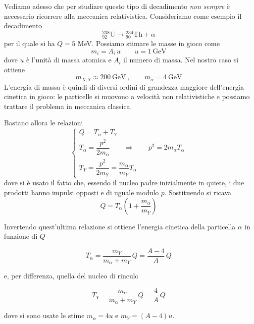 Vediamo adesso che per studiare questo tipo di decadimento \emph{non sempre} è necessario ricorrere alla meccanica relativistica. Consideriamo come esempio il decadimento 
%
\begin{equation*}
    {}^{238}_{92}\mathrm{U} \longrightarrow {}^{234}_{90}\mathrm{Th} + \alpha
\end{equation*}
per il quale si ha $Q = 5$ MeV. Possiamo stimare le masse in gioco come 
%
\begin{equation}
    m_i = A_i \, u \qquad u = 1 \ \mathrm{GeV}
\end{equation}
dove $u$ è l'unità di massa atomica e $A_i$ il numero di massa. Nel nostro caso si ottiene 
%
\begin{equation}
    m_{X,Y} \approx 200 \ \mathrm{GeV} \ , \qquad m_{\alpha} = 4 \ \mathrm{GeV}
\end{equation}
L'energia di massa è quindi di diversi ordini di grandezza maggiore dell'energia cinetica in gioco: le particelle si muovono a velocità non relativistiche e possiamo trattare il problema in meccanica classica. 

Bastano allora le relazioni 
%
\begin{equation}
\begin{cases}
    Q = T_{\alpha} + T_Y \\[4pt]
    T_{\alpha} = \dfrac{p^2}{2m_{\alpha}} \qquad \Longrightarrow \qquad p^2 = 2 m_{\alpha} T_{\alpha} \\[8pt]
    T_Y = \dfrac{p^2}{2m_Y} = \dfrac{m_{\alpha}}{m_Y} T_{\alpha}
\end{cases}
\end{equation}
dove si è usato il fatto che, essendo il nucleo padre inizialmente in quiete, i due prodotti hanno impulsi opposti e di uguale modulo $p$. Sostituendo si ricava
%
\begin{equation}
    Q = T_{\alpha} \left( 1 + \frac{m_{\alpha}}{m_Y} \right)
\end{equation}

Invertendo quest'ultima relazione si ottiene l'energia cinetica della particella $\alpha$ in funzione di $Q$
%
\begin{tcolorbox}[colback=black!5!white, colframe=black!45!white, boxrule=0.8pt]
\begin{equation}
    T_{\alpha} = \frac{m_Y}{m_{\alpha} + m_Y} \, Q = \frac{A-4}{A} \, Q
\end{equation}
\end{tcolorbox}
e, per differenza, quella del nucleo di rinculo
%
\begin{tcolorbox}[colback=black!5!white, colframe=black!45!white, boxrule=0.8pt]
\begin{equation}
    T_Y = \frac{m_{\alpha}}{m_{\alpha} + m_Y} \, Q = \frac{4}{A} \, Q
\end{equation}
\end{tcolorbox}
dove si sono usate le stime $m_{\alpha} = 4u$ e $m_Y = (A-4)u$. 

